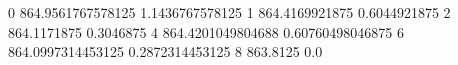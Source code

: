 0 864.9561767578125 1.1436767578125
1 864.4169921875 0.6044921875
2 864.1171875 0.3046875
4 864.4201049804688 0.60760498046875
6 864.0997314453125 0.2872314453125
8 863.8125 0.0
